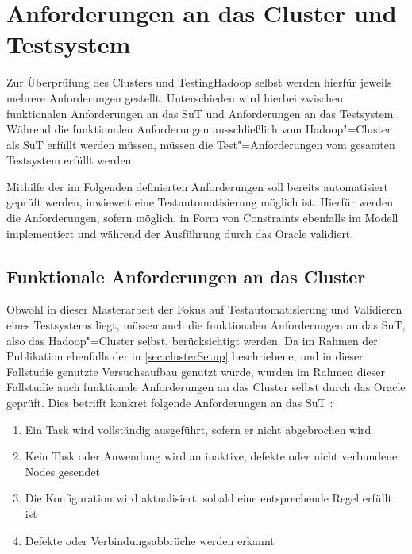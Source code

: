 \section{Anforderungen an das Cluster und Testsystem}
\label{sec:requirements}

Zur Überprüfung des Clusters und TestingHadoop selbst werden hierfür jeweils mehrere Anforderungen gestellt.
Unterschieden wird hierbei zwischen funktionalen Anforderungen an das \gls{SuT} und Anforderungen an das Testsystem.
Während die funktionalen Anforderungen ausschließlich vom Hadoop"=Cluster als \gls{SuT} erfüllt werden müssen, müssen die Test"=Anforderungen vom gesamten Testsystem erfüllt werden.

Mithilfe der im Folgenden definierten Anforderungen soll bereits automatisiert geprüft werden, inwieweit eine Testautomatisierung möglich ist.
Hierfür werden die Anforderungen, sofern möglich, in Form von Constraints ebenfalls im Modell implementiert und während der Ausführung durch das Oracle validiert.

\subsection{Funktionale Anforderungen an das Cluster}
\label{subsec:functionalRequirements}

Obwohl in dieser Masterarbeit der Fokus auf Testautomatisierung und Validieren eines Testsystems liegt, müssen auch die funktionalen Anforderungen an das \gls{SuT}, also das Hadoop"=Cluster selbst, berücksichtigt werden.
Da im Rahmen der Publikation \cite{Eberhardinger2018} ebenfalls der in \cref{sec:clusterSetup} beschriebene, und in dieser Fallstudie genutzte Versuchsaufbau genutzt wurde, wurden im Rahmen dieser Fallstudie auch funktionale Anforderungen an das Cluster selbst durch das Oracle geprüft.
Dies betrifft konkret folgende Anforderungen an das \gls{SuT} \cite{Eberhardinger2018}:

\begin{enumerate}
    \item Ein Task wird vollständig ausgeführt, sofern er nicht abgebrochen wird
    \item Kein Task oder Anwendung wird an inaktive, defekte oder nicht verbundene Nodes gesendet
    \item Die Konfiguration wird aktualisiert, sobald eine entsprechende Regel erfüllt ist
    \item Defekte oder Verbindungsabbrüche werden erkannt
\end{enumerate}

